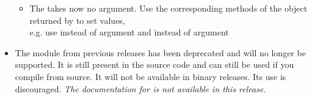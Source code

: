 \begin{itemize}
\begin{itemize}
\item The  takes now no argument. Use the corresponding
methods of the \SolverOptions object returned by  
to set values,\\ e.g. use
 instead of argument 
and  instead of argument 
\end{itemize}

\item
The \pyvisi module from previous releases has been deprecated and will no longer be supported.
It is still present in the source code and can still be used if you compile \escript from source.
It will not be available in binary releases.
Its use is discouraged.
\emph{The documentation for \pyvisi is not available in this release.}

\end{itemize}
